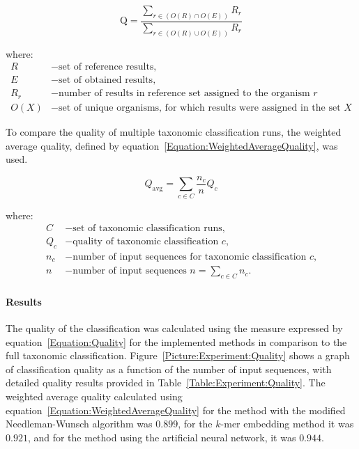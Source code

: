 \documentclass[pdflatex,sn-vancouver-num]{sn-jnl}%
\begin{document}
            \begin{equation}
                \text{Q} = \frac{
                    \sum_{r \in (O(R) \cap O(E))} R_{r}
                }{
                    \sum_{r \in (O(R) \cup O(E))} R_{r}
                }
                \label{Equation:Quality}
            \end{equation}

            where:
            \begin{align*}
                R &- \text{set of reference results,} \\
                E &- \text{set of obtained results,} \\
                R_{r} &- \text{number of results in reference set assigned to the organism $r$} \\
                O(X) &- \text{set of unique organisms, for which results were assigned in the set $X$}
            \end{align*}

            To compare the quality of multiple taxonomic classification runs, the weighted average quality, defined by equation~\ref{Equation:WeightedAverageQuality}, was used.
            
            \begin{equation}
                Q_{\text{avg}} = \sum_{c \in C} \frac{n_c}{n} Q_c
                \label{Equation:WeightedAverageQuality}
            \end{equation}

            where:
            \begin{align*}
            C &- \text{set of taxonomic classification runs,} \\
            Q_c &- \text{quality of taxonomic classification $c$,} \\
            n_c &- \text{number of input sequences for taxonomic classification $c$,}\\
            n   &- \text{number of input sequences $n = \sum_{c \in C} n_{c}.$}
            \end{align*}

                  

                \paragraph{Results}
                The quality of the classification was calculated using the measure expressed by equation~\ref{Equation:Quality} for the implemented methods in comparison to the full taxonomic classification. Figure~\ref{Picture:Experiment:Quality} shows a graph of classification quality as a function of the number of input sequences, with detailed quality results provided in Table~\ref{Table:Experiment:Quality}. The weighted average quality calculated using equation~\ref{Equation:WeightedAverageQuality} for the method with the modified Needleman-Wunsch algorithm was $0.899$, for the $k$-mer embedding method it was $0.921$, and for the method using the artificial neural network, it was $0.944$.
\end{document}
